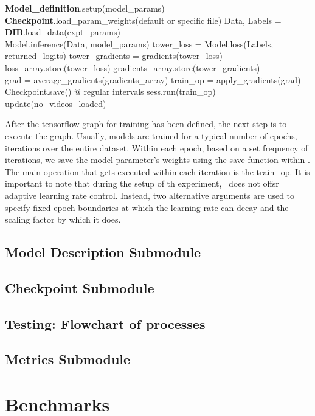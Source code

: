 \documentclass{llncs}
\begin{document}
\begin{algorithmic}[H]
\State \textbf{Model\_definition}.setup(model\_params)
\State \textbf{Checkpoint}.load\_param\_weights(default or specific file)
\State Data, Labels = \textbf{DIB}.load\_data(expt\_params)
\\
\State Model.inference(Data, model\_params)
\State tower\_loss = Model.loss(Labels, returned\_logits)
\State tower\_gradients = gradients(tower\_loss)
\State loss\_array.store(tower\_loss)
\State gradients\_array.store(tower\_gradients)
\EndFor
\\
\State grad = average\_gradients(gradients\_array)
\State train\_op = apply\_gradients(grad)
\\
\State Checkpoint.save() @ regular intervals
\State sess.run(train\_op)
\State update(no\_videos\_loaded)
\EndWhile
\EndProcedure
\end{algorithmic}

After the tensorflow graph for training has been defined, the next step is to execute the graph. 
Usually, models are trained for a typical number of epochs, iterations over the entire dataset.
Within each epoch, based on a set frequency of iterations, we save the model parameter's weights using the save function within \checkpoint.
The main operation that gets executed within each iteration is the train\_op.
It is important to note that during the setup of th experiment, \acro~does not offsr adaptive learning rate control. Instead, two alternative arguments are used to specify fixed epoch boundaries at which the learning rate can decay and the scaling factor by which it does.

\subsection{Model Description Submodule}
\label{sec:modeldesc}

\subsection{Checkpoint Submodule}
\label{sec:checkpoint}

\subsection{Testing: Flowchart of processes}
\label{sec:testing}

\subsection{Metrics Submodule}
\label{sec:metrics}

\section{Benchmarks}
\label{sec:benchmarks}

\clearpage



\end{document}
